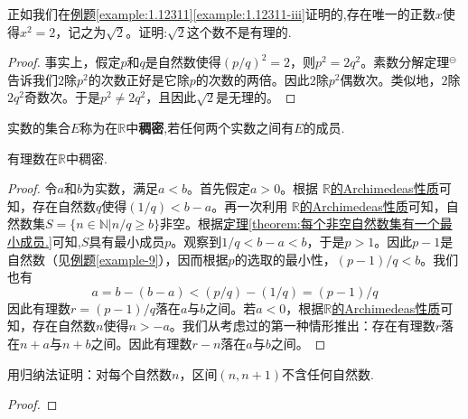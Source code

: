 \documentclass[lang=cn,newtx,10pt,scheme=chinese]{elegantbook}
\begin{document}
\begin{example}
  正如我们在\hyperref[example:1.12311-iii]{例题\ref{example:1.12311}\ref{example:1.12311-iii}}证明的,存在唯一的正数\(x\)使得\(x^2 = 2\)，记之为\(\sqrt{2}\)。证明:\(\sqrt{2}\)这个数不是有理的.
\end{example}
\begin{proof}
  事实上，假定\(p\)和\(q\)是自然数使得\((p/q)^2 = 2\)，则\(p^2 = 2q^2\)。素数分解定理$^{\ominus}$告诉我们\(2\)除\(p^2\)的次数正好是它除\(p\)的次数的两倍。因此\(2\)除\(p^2\)偶数次。类似地，\(2\)除\(2q^2\)奇数次。于是\(p^2\neq2q^2\)，且因此\(\sqrt{2}\)是无理的。
\end{proof}

\begin{definition}[稠密]\label{definition:稠密}
  实数的集合\(E\)称为在\(\mathbb{R}\)中\textbf{稠密},若任何两个实数之间有\(E\)的成员.
\end{definition}

\begin{theorem}[有理数的稠密性]\label{theorem:有理数的稠密性}
  有理数在\(\mathbb{R}\)中稠密.
\end{theorem}
\begin{proof}
  令\(a\)和\(b\)为实数，满足\(a < b\)。首先假定\(a>0\)。根据 \hyperref[theorem:实数的Archimedeas性质]{\(\mathbb{R}\)的Archimedeas性质}可知，存在自然数\(q\)使得\((1/q)<b - a\)。再一次利用 \hyperref[theorem:实数的Archimedeas性质]{\(\mathbb{R}\)的Archimedeas性质}可知，自然数集\(S=\{n\in\mathbb{N}|n/q\geqslant b\}\)非空。根据\hyperref[theorem:每个非空自然数集有一个最小成员.]{定理\ref{theorem:每个非空自然数集有一个最小成员.}}可知,\(S\)具有最小成员\(p\)。观察到\(1/q<b - a<b\)，于是\(p>1\)。因此\(p - 1\)是自然数（见\hyperref[example-9]{例题\ref{example-9}}），因而根据\(p\)的选取的最小性，\((p - 1)/q<b\)。我们也有
\[
a = b-(b - a)<(p/q)-(1/q)=(p - 1)/q
\]
因此有理数\(r=(p - 1)/q\)落在\(a\)与\(b\)之间。若\(a<0\)，根据\hyperref[theorem:实数的Archimedeas性质]{\(\mathbb{R}\)的Archimedeas性质}可知，存在自然数\(n\)使得\(n>-a\)。我们从考虑过的第一种情形推出：存在有理数\(r\)落在\(n + a\)与\(n + b\)之间。因此有理数\(r - n\)落在\(a\)与\(b\)之间。
\end{proof}

\begin{example}\label{example-1111}
  用归纳法证明：对每个自然数\(n\)，区间\((n, n + 1)\)不含任何自然数.
\end{example}
\begin{proof}
  
\end{proof}
\end{document}

